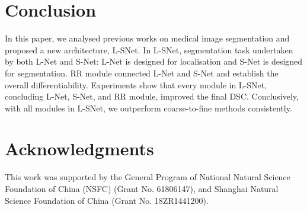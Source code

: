 \documentclass{article}
\begin{document}
\vspace{-24pt}
\section{Conclusion}
\vspace{-8pt}


In this paper, we analysed previous works on medical image segmentation and proposed a new architecture, L-SNet. In L-SNet, segmentation task undertaken by both L-Net and S-Net: L-Net is designed for localisation and S-Net is designed for segmentation. RR module connected L-Net and S-Net and establish the overall differentiability. Experiments show that every module in L-SNet, concluding L-Net, S-Net, and RR module, improved the final DSC. Conclusively, with all modules in L-SNet, we outperform coarse-to-fine methods consistently.

\vspace{-15pt}
\section{Acknowledgments}
\label{sec:majhead}\vspace{-8pt}
This work was supported by the General Program of National Natural Science Foundation of China (NSFC) (Grant No. 61806147), and Shanghai Natural Science Foundation of China (Grant No. 18ZR1441200).



\end{document}
